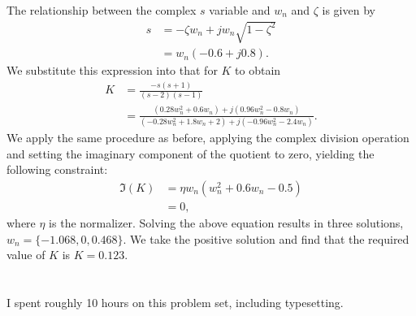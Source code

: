 \documentclass[paper=letter, fontsize=11pt]{scrartcl} %
\numberwithin{equation}{section} %
\numberwithin{figure}{section} %
\numberwithin{table}{section} %
\begin{document}
The relationship between the complex $s$ variable and $w_n$ and $\zeta$ is given by 
\begin{align*}
s &= -\zeta w_n + j w_n \sqrt{1 - \zeta^2} \\
&= w_n(-0.6 + j 0.8).
\end{align*}
We substitute this expression into that for $K$ to obtain
\begin{align*}
K &= \frac{-s(s + 1)}{(s-2)(s-1)} \\
&= \frac{(0.28 w_n^2 + 0.6 w_n) + j (0.96 w_n^2 - 0.8 w_n)}{(-0.28 w_n^2 + 1.8 w_n + 2) + j(-0.96 w_n^2 - 2.4 w_n)}.
\end{align*}
We apply the same procedure as before, applying the complex division operation and
setting the imaginary component of the quotient to zero, yielding the following
constraint:
\begin{align*}
\Im(K) &= \eta w_n(w_n^2 + 0.6 w_n - 0.5) \\
&= 0,
\end{align*}
where $\eta$ is the normalizer. Solving the above equation results in three solutions, 
$w_n = \{-1.068, 0, 0.468\}$. We take the positive solution and find that the required
value of $K$ is $K = 0.123$.

\section{}
I spent roughly 10 hours on this problem set, including typesetting. 



\end{document}
